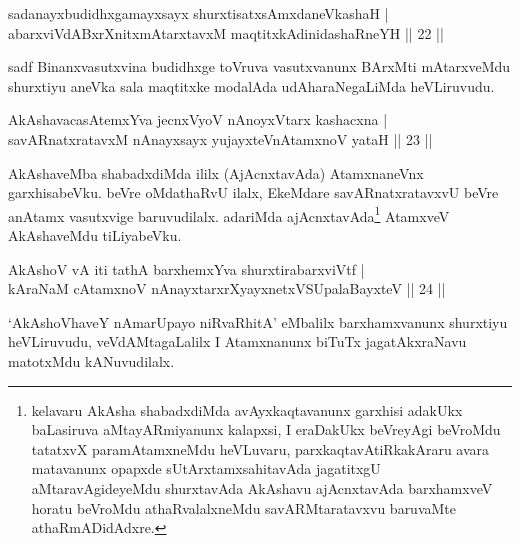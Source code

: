 
\begin{shl}
sadanayxbudidhxgamayxsayx shurxtisatxsAmxdaneVkashaH |\\
abarxviVdABxrXnitxmAtarxtavxM maqtitxkAdinidashaRneYH \hfill || 22 ||
\end{shl}

\begin{artha}
sadf Binanxvasutxvina budidhxge toVruva vasutxvanunx BArxMti mAtarxveMdu shurxtiyu aneVka sala maqtitxke modalAda udAharaNegaLiMda heVLiruvudu.
\end{artha}


\begin{shl}
AkAshavacasA\s \s temxYva jecnxVyoV nAnoyxV\s tarx kashacxna |\\
savARnatxratavxM nAnayxsayx yujayxteV\s nAtamxnoV yataH \hfill || 23 ||
\end{shl}

\begin{artha}
AkAshaveMba shabadxdiMda ililx (AjAcnxtavAda) AtamxnaneVnx garxhisabeVku. beVre oMdathaRvU ilalx, EkeMdare savARnatxratavxvU beVre anAtamx vasutxvige baruvudilalx. adariMda ajAcnxtavAda\footnote{kelavaru AkAsha shabadxdiMda avAyxkaqtavanunx garxhisi adakUkx baLasiruva aMtayARmiyanunx kalapxsi, I eraDakUkx beVreyAgi beVroMdu tatatxvX paramAtamxneMdu heVLuvaru, parxkaqtavAtiRkakAraru avara matavanunx opapxde sUtArxtamxsahitavAda jagatitxgU aMtaravAgideyeMdu shurxtavAda AkAshavu ajAcnxtavAda barxhamxveV horatu beVroMdu athaRvalalxneMdu savARMtaratavxvu baruvaMte athaRmADidAdxre.} AtamxveV AkAshaveMdu tiLiyabeVku.
\end{artha}


\begin{shl}
AkAshoV vA iti tathA barxhemxYva shurxtirabarxviVtf |\\
kAraNaM cA\s \s tamxnoV nAnayxtarxrXyayxnetxVSUpalaBayxteV \hfill || 24 ||
\end{shl}

\begin{artha}
`AkAshoVhaveY nAmarUpayo niRvaRhitA' eMbalilx barxhamxvanunx shurxtiyu heVLiruvudu, veVdAMtagaLalilx I Atamxnanunx biTuTx jagatAkxraNavu matotxMdu kANuvudilalx.
\end{artha}

